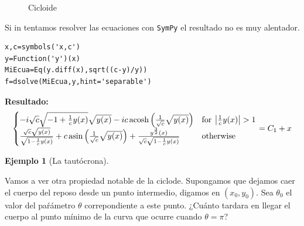 \documentclass{article}
\newtheorem{ejemplo}{Ejemplo}}
\begin{document}


\begin{figure}[h]
\begin{center}
\end{center}\caption{Cicloide}\label{fig:cicloide}
\end{figure}


Si in tentamos resolver las ecuaciones con \texttt{SymPy} el resultado no es muy alentador.

\begin{lstlisting}
x,c=symbols('x,c')
y=Function('y')(x)
MiEcua=Eq(y.diff(x),sqrt((c-y)/y))
f=dsolve(MiEcua,y,hint='separable')
\end{lstlisting}
\textbf{Resultado:}
\[
 \begin{cases} - i \sqrt{c} \sqrt{-1 + \frac{1}{c} y{\left (x \right )}} \sqrt{y{\left (x \right )}} - i c \operatorname{acosh}{\left (\frac{1}{\sqrt{c}} \sqrt{y{\left (x \right )}} \right )} & \text{for}\: \left\lvert{\frac{1}{c} y{\left (x \right )}}\right\rvert > 1 \\ \- \frac{\sqrt{c} \sqrt{y{\left (x \right )}}}{\sqrt{1 - \frac{1}{c} y{\left (x \right )}}} + c \operatorname{asin}{\left (\frac{1}{\sqrt{c}} \sqrt{y{\left (x \right )}} \right )} + \frac{y^{\frac{3}{2}}{\left (x \right )}}{\sqrt{c} \sqrt{1 - \frac{1}{c} y{\left (x \right )}}} & \text{otherwise} \end{cases} = C_{1} + x
\]




  \begin{ejemplo}[La tautócrona]


  \end{ejemplo}




  Vamos a ver otra propiedad notable de la ciclode. Supongamos que dejamos caer el cuerpo del reposo desde un punto intermedio, digamos en $(x_0,y_0)$. Sea  $\theta_0$
 el valor del paŕámetro $\theta$ correpondiente a este punto. ¿Cuánto tardara en llegar el cuerpo al punto mínimo de la curva que ocurre cuando $\theta=\pi$? 
\end{document}
